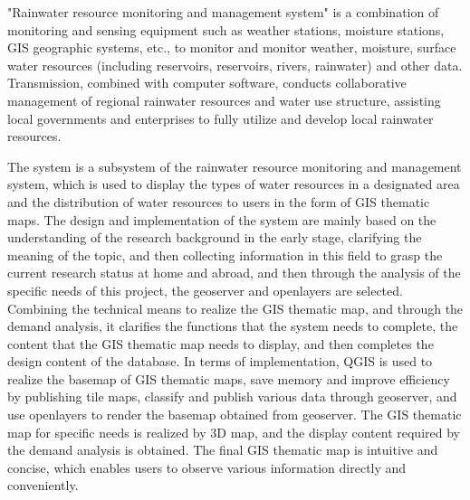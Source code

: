 "Rainwater resource monitoring and management system" is a combination of monitoring and sensing equipment such as weather stations, moisture stations, GIS geographic systems, etc., to monitor and monitor weather, moisture, surface water resources (including reservoirs, reservoirs, rivers, rainwater) and other data. Transmission, combined with computer software, conducts collaborative management of regional rainwater resources and water use structure, assisting local governments and enterprises to fully utilize and develop local rainwater resources.

The system is a subsystem of the rainwater resource monitoring and management system, which is used to display the types of water resources in a designated area and the distribution of water resources to users in the form of GIS thematic maps. The design and implementation of the system are mainly based on the understanding of the research background in the early stage, clarifying the meaning of the topic, and then collecting information in this field to grasp the current research status at home and abroad, and then through the analysis of the specific needs of this project, the geoserver and openlayers are selected. Combining the technical means to realize the GIS thematic map, and through the demand analysis, it clarifies the functions that the system needs to complete, the content that the GIS thematic map needs to display, and then completes the design content of the database. In terms of implementation, QGIS is used to realize the basemap of GIS thematic maps, save memory and improve efficiency by publishing tile maps, classify and publish various data through geoserver, and use openlayers to render the basemap obtained from geoserver. The GIS thematic map for specific needs is realized by 3D map, and the display content required by the demand analysis is obtained. The final GIS thematic map is intuitive and concise, which enables users to observe various information directly and conveniently.